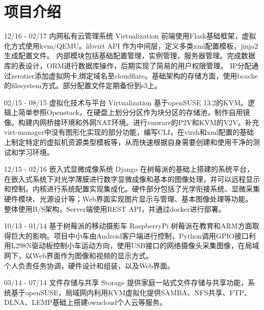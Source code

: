 \documentclass[]{friggeri-cv}
\begin{document}
\section{项目介绍}
\begin{entrylist}
  \entry
    {12/16 - 02/17}
    {内网私有云管理系统}
    {Virtualization}
    { 前端使用Flask基础框架，虚拟化方式使用kvm/QEMU。libvirt API 作为中间层，定义多类xml配置模板，jinja2生成配置文件。
内部模块包括基础配置管理，实例管理，服务器管理。完成数据库的表设计，ORM进行数据库操作，后期实现了简易的用户权限管理。
IP分配通过zerotier添加虚拟网卡,绑定域名至cloudflare。基础架构的存储方面，使用bcache的filesystem方式。部分配置文件定期备份到s3上。
    \\}


  \entry
    {02/15 - 08/15 }
    {虚拟化技术与平台}
    {Virtualization}
    {基于openSUSE 13.2的KVM。逻辑上简单参照Openstack，在硬盘上划分分区作为块分区的存储池，制作自用镜像。构建内网桥接环境和外网NAT环境。进行vmware的P2V和KVM的V2V。补充virt-manager中没有图形化实现的部分功能，编写CLI，在virsh和xml配置的基础上制定特定的虚拟机资源类型模板等，从而快速根据自身需要创建和使用干净的测试和学习环境。
    \\}   

  \entry
    {12/15 - 02/16}
    {嵌入式显微成像系统}
    {Django}
    {在树莓派的基础上搭建的系统平台，在嵌入式系统下对光学薄膜进行数字显微成像和基本的图像处理，并可以远程显示和控制。内核进行系统配置实现集成化。硬件部分包括了光学衔接系统、显微采集硬件模块、光源设计等；Web界面实现图片显示与管理、基本图像处理等功能。\\
    整体使用B/S架构，Server端使用REST API，并通过docker进行部署。
   \\ }%

   \entry
   {10/13 - 01/14}
   {基于树莓派的移动摄影车}
   {RaspberryPi}
   {
    树莓派在教育和ARM方面取得巨大的影响。项目中小车由Android客户端进行控制，Python调用GPIO接口利用L298N驱动板控制小车运动方向，使用USB接口的网络摄像头采集图像，在局域网下，以Web界面作为图像和视频的显示方式。\\
    个人负责任务协调，硬件设计和组装，以及Web界面。\\
   }

  \entry
    {03/14 - 07/14 }
    {文件存储与共享}
    {Storage}
    {提供家庭一站式文件存储与共享功能，系统基于openSUSE，局域网内利用KVM虚拟化提供SAMBA、NFS共享、FTP、DLNA、LEMP基础上搭建owncloud个人云等服务。\\}%
\end{entrylist}
\end{document}
